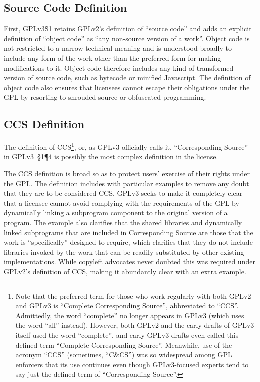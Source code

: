 \subsection{Source Code Definition}

First, GPLv3\~S1 retains GPLv2's definition of ``source code'' and adds an
explicit definition of ``object code'' as ``any non-source version of a
work''.  Object code is not restricted to a narrow technical meaning and is
understood broadly to include any form of the work other than the preferred
form for making modifications to it.  Object code therefore includes any kind
of transformed version of source code, such as bytecode or minified
Javascript.  The definition of object code also ensures that licensees cannot
escape their obligations under the GPL by resorting to shrouded source or
obfuscated programming.

\subsection{CCS Definition}

The definition of CCS\footnote{Note that the preferred term for those who
  work regularly with both GPLv2 and GPLv3 is ``Complete Corresponding
  Source'', abbreviated to ``CCS''.  Admittedly, the word ``complete'' no
  longer appears in GPLv3 (which uses the word ``all'' instead).  However,
  both GPLv2 and the early drafts of GPLv3 itself used the word ``complete'',
  and early GPLv3 drafts even called this defined term ``Complete
  Corresponding Source''.  Meanwhile, use of the acronym ``CCS'' (sometimes,
  ``C\&CS'') was so widespread among GPL enforcers that its use continues
  even though GPLv3-focused experts tend to say just the defined term of
  ``Corresponding Source''.}, or, as GPLv3 officially calls it,
``Corresponding Source'' in GPLv3~\S1\P4 is possibly the most complex
definition in the license.

The CCS definition is broad so as to protect users' exercise of their rights
under the GPL\@.  The definition includes with particular examples to remove
any doubt that they are to be considered CCS\@.  GPLv3 seeks to make it
completely clear that a licensee cannot avoid complying with the requirements
of the GPL by dynamically linking a subprogram component to the original
version of a program.  The example also clarifies that the shared libraries
and dynamically linked subprograms that are included in Corresponding Source
are those that the work is ``specifically'' designed to require, which
clarifies that they do not include libraries invoked by the work that can be
readily substituted by other existing implementations.  While copyleft
advocates never doubted this was required under GPLv2's definition of CCS,
making it abundantly clear with an extra example.

